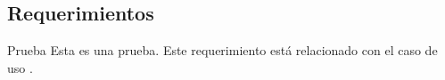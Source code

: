%
%

\subsection{Requerimientos}

{Prueba}
{
  Esta es una prueba. Este requerimiento está relacionado con el caso de uso
  .
}

